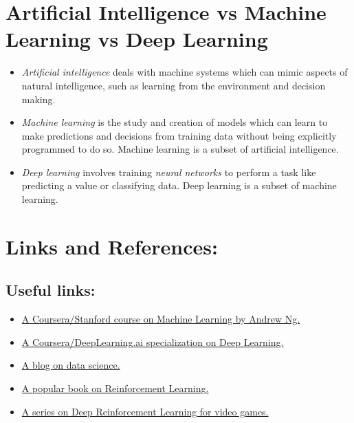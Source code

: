 \documentclass{article}
\begin{document}
    \section{Artificial Intelligence vs Machine Learning vs Deep Learning}
        \begin{itemize}
            \item \emph{Artificial intelligence} deals with machine systems
            which can mimic aspects of natural intelligence, such as learning
            from the environment and decision making.
        
            \item \emph{Machine learning} is the study and creation of models which can
            learn to make predictions and decisions from training data without 
            being explicitly programmed to do so. Machine learning is a subset
            of artificial intelligence.
        
            \item \emph{Deep learning} involves training \emph{neural networks} to
            perform a task like predicting a value or classifying data. Deep
            learning is a subset of machine learning.
        \end{itemize}
        \begin{center}
        \end{center}

    \section{Links and References:}
        \subsection{Useful links:}
            \begin{itemize}
                \item \href{https://www.coursera.org/learn/machine-learning}{A Coursera/Stanford course on Machine Learning by Andrew Ng.}
                \item \href{https://www.coursera.org/specializations/deep-learning}{A Coursera/DeepLearning.ai specialization on Deep Learning.}
                \item \href{https://towardsdatascience.com/}{A blog on data science.}
                \item \href{http://incompleteideas.net/book/the-book-2nd.html}{A popular book on Reinforcement Learning.}
                \item \href{https://spinningup.openai.com/en/latest/}{A series on Deep Reinforcement Learning for video games.}
            \end{itemize}
\end{document}
